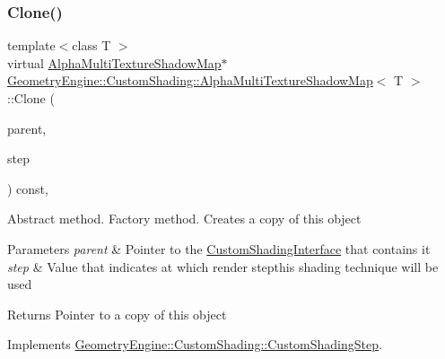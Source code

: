 \subsubsection{\texorpdfstring{Clone()}{Clone()}}
{\footnotesize\ttfamily template$<$class T $>$ \\
virtual \mbox{\hyperlink{class_geometry_engine_1_1_custom_shading_1_1_alpha_multi_texture_shadow_map}{Alpha\+Multi\+Texture\+Shadow\+Map}}$\ast$ \mbox{\hyperlink{class_geometry_engine_1_1_custom_shading_1_1_alpha_multi_texture_shadow_map}{Geometry\+Engine\+::\+Custom\+Shading\+::\+Alpha\+Multi\+Texture\+Shadow\+Map}}$<$ T $>$\+::Clone (\begin{DoxyParamCaption}\item[{\mbox{\hyperlink{class_geometry_engine_1_1_custom_shading_1_1_custom_shading_interface}{Custom\+Shading\+Interface}} $\ast$}]{parent,  }\item[{\mbox{\hyperlink{namespace_geometry_engine_1_1_custom_shading_a2dc236a5b567da5099069ce2b2be5609}{Custom\+Shading\+Steps}}}]{step }\end{DoxyParamCaption}) const\hspace{0.3cm}{\ttfamily [inline]}, {\ttfamily [virtual]}}

Abstract method. Factory method. Creates a copy of this object 
\begin{DoxyParams}{Parameters}
{\em parent} & Pointer to the \mbox{\hyperlink{class_geometry_engine_1_1_custom_shading_1_1_custom_shading_interface}{Custom\+Shading\+Interface}} that contains it \\
\hline
{\em step} & Value that indicates at which render stepthis shading technique will be used \\
\hline
\end{DoxyParams}
\begin{DoxyReturn}{Returns}
Pointer to a copy of this object 
\end{DoxyReturn}


Implements \mbox{\hyperlink{class_geometry_engine_1_1_custom_shading_1_1_custom_shading_step_aa9279c195d3a8f294860a431508675c3}{Geometry\+Engine\+::\+Custom\+Shading\+::\+Custom\+Shading\+Step}}.

\mbox{\label{class_geometry_engine_1_1_custom_shading_1_1_alpha_multi_texture_shadow_map_a6bd8b95d6b83ac8513e4885899c33a19}} 
